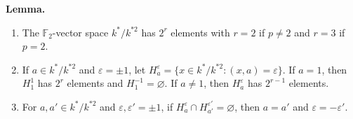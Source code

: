 \textbf{Lemma.}
\begin{enumerate}
\item[(a)] The $\mathbb{F}_2$-vector space $k^*/k^{*2}$ has $2^r$ elements with $r = 2$ if $p \neq 2$ and $r = 3$ if $p = 2$.
\item[(b)] If $a \in k^*/k^{*2}$ and $\varepsilon = \pm 1$, let $H_a^\varepsilon = \{x \in k^*/k^{*2} : (x, a) = \varepsilon\}$. If $a = 1$, then $H_1^1$ has $2^r$ elements and $H_1^{-1} = \varnothing$. If $a \neq 1$, then $H_a^\varepsilon$ has $2^{r-1}$ elements.
\item[(c)] For $a, a' \in k^*/k^{*2}$ and $\varepsilon, \varepsilon' = \pm 1$, if $H_a^\varepsilon \cap H_{a'}^{\varepsilon'} = \varnothing$, then $a = a'$ and $\varepsilon = -\varepsilon'$.
\end{enumerate}

